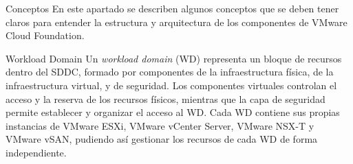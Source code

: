 \begin{section}{Conceptos}
En este apartado se describen algunos conceptos que se deben tener claros para entender la estructura y arquitectura de los componentes de VMware Cloud Foundation.



\begin{subsection}{Workload Domain}
Un \textit{workload domain} (WD) representa un bloque de recursos dentro del SDDC, formado por componentes de la infraestructura física, de la infraestructura virtual, y de seguridad. Los componentes virtuales controlan el acceso y la reserva de los recursos físicos, mientras que la capa de seguridad permite establecer y organizar el acceso al WD. Cada WD contiene sus propias instancias de VMware ESXi, VMware vCenter Server, VMware NSX-T y VMware vSAN, pudiendo así gestionar los recursos de cada WD de forma independiente.


\end{subsection}
\end{section}
